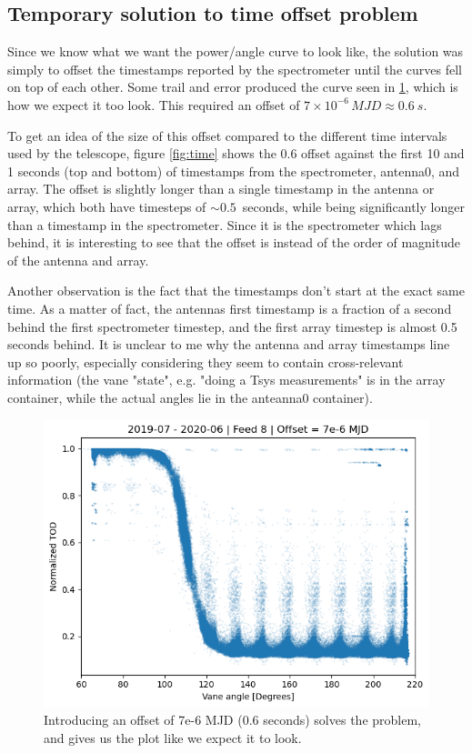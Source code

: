 \documentclass[10pt, a4paper]{article}
\begin{document}
\subsection{Temporary solution to time offset problem}
Since we know what we want the power/angle curve to look like, the solution was simply to offset the timestamps reported by the spectrometer until the curves fell on top of each other. Some trail and error produced the curve seen in \ref{fig:tod_angle_scatter_offset}, which is how we expect it too look. This required an offset of $7\times 10^{-6}\,\si{MJD} \approx \SI{0.6}{s}$.

To get an idea of the size of this offset compared to the different time intervals used by the telescope, figure \ref{fig:time} shows the 0.6 offset against the first 10 and 1 seconds (top and bottom) of timestamps from the spectrometer, antenna0, and array. The offset is slightly longer than a single timestamp in the antenna or array, which both have timesteps of $\sim 0.5$ seconds, while being significantly longer than a timestamp in the spectrometer. Since it is the spectrometer which lags behind, it is interesting to see that the offset is instead of the order of magnitude of the antenna and array.

Another observation is the fact that the timestamps don't start at the exact same time. As a matter of fact, the antennas first timestamp is a fraction of a second behind the first spectrometer timestep, and the first array timestep is almost 0.5 seconds behind. It is unclear to me why the antenna and array timestamps line up so poorly, especially considering they seem to contain cross-relevant information (the vane "state", e.g. "doing a Tsys measurements" is in the array container, while the actual angles lie in the anteanna0 container).

\begin{figure}[h!]
    \centering
    \includegraphics[scale=0.6]{../plots/power_angle_all_7e-6.png}
    \caption{Introducing an offset of 7e-6 MJD (0.6 seconds) solves the problem, and gives us the plot like we expect it to look.}
    \label{fig:tod_angle_scatter_offset}
\end{figure}
\end{document}
